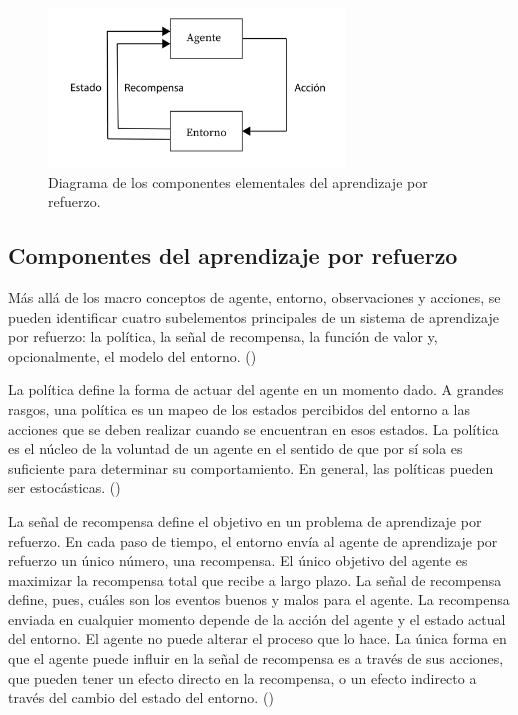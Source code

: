 \begin{figure}[ht!]
    \centering
    \includegraphics[width=0.7\textwidth]{Graphics/rl-elements.png}
    \caption{Diagrama de los componentes elementales del aprendizaje por refuerzo.}
    \label{fig:rl-elements}
\end{figure}

\subsection{Componentes del aprendizaje por refuerzo}

Más allá de los macro conceptos de agente, entorno, observaciones y acciones, se pueden identificar cuatro subelementos principales de un sistema de aprendizaje por refuerzo: la política, la señal de recompensa, la función de valor y, opcionalmente, el modelo del entorno. (\cite{sutton1998introduction})

La política define la forma de actuar del agente en un momento dado. A grandes rasgos, una política es un mapeo de los estados percibidos del entorno a las acciones que se deben realizar cuando se encuentran en esos estados. La política es el núcleo de la voluntad de un agente en el sentido de que por sí sola es suficiente para determinar su comportamiento. En general, las políticas pueden ser estocásticas. (\cite{sutton1998introduction})

La señal de recompensa define el objetivo en un problema de aprendizaje por refuerzo. En cada paso de tiempo, el entorno envía al agente de aprendizaje por refuerzo un único número, una recompensa. El único objetivo del agente es maximizar la recompensa total que recibe a largo plazo. La señal de recompensa define, pues, cuáles son los eventos buenos y malos para el agente. La recompensa enviada en cualquier momento depende de la acción del agente y el estado actual del entorno. El agente no puede alterar el proceso que lo hace. La única forma en que el agente puede influir en la señal de recompensa es a través de sus acciones, que pueden tener un efecto directo en la recompensa, o un efecto indirecto a través del cambio del estado del entorno. (\cite{sutton1998introduction})

